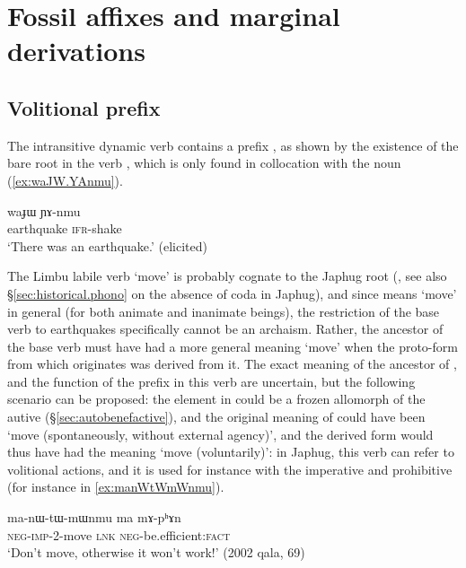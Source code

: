 \section{Fossil affixes and marginal derivations} \label{sec:marginal.derivations}


\subsection{Volitional  prefix} \label{sec:volitional.mW}
The intransitive dynamic verb  contains a prefix , as shown by the existence of the bare root  in the verb  \citep{jacques17volitional}, which is only found in collocation with the noun  (\ref{ex:waJW.YAnmu}).


\begin{exe}
\ex \label{ex:waJW.YAnmu}
\gll waɟɯ ɲɤ-nmu \\
earthquake \textsc{ifr}-shake \\
\glt `There was an earthquake.' (elicited)
\end{exe}

The Limbu labile verb  `move' \citep{michailovsky02dico} is probably cognate to the Japhug root (\citealt[212]{jacques17pkiranti}, see also §\ref{sec:historical.phono} on the absence of coda in Japhug), and since  means `move' in general (for both animate and inanimate beings), the restriction of the base verb  to earthquakes specifically cannot be an archaism. Rather, the ancestor of the base verb  must have had a more general meaning `move' when the proto-form from which  originates was derived from it. The exact meaning of the ancestor of , and the function of the  prefix in this verb are uncertain, but the following scenario can be proposed: the  element in  could be a frozen allomorph of the autive (§\ref{sec:autobenefactive}), and the original meaning of  could have been `move (spontaneously, without external agency)', and the derived form  would thus have had the meaning `move (voluntarily)': in Japhug, this verb can refer to volitional actions, and it is used for instance with the imperative and prohibitive (for instance in \ref{ex:manWtWmWnmu}).

\begin{exe}
\ex \label{ex:manWtWmWnmu}
\gll ma-nɯ-tɯ-mɯnmu ma mɤ-pʰɤn \\
\textsc{neg}-\textsc{imp}-2-move \textsc{lnk} \textsc{neg}-be.efficient:\textsc{fact} \\
\glt `Don't move, otherwise it won't work!' (2002 qala, 69)
\end{exe}

